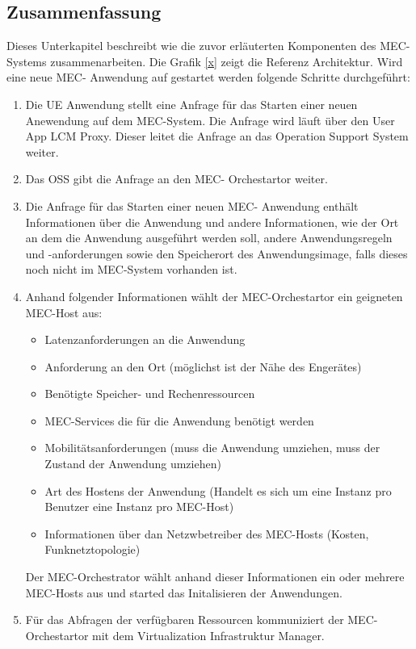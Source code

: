 \documentclass[runningheads]{llncs}
\numberwithin{figure}{section}
\begin{document}
\subsection{Zusammenfassung}
Dieses Unterkapitel beschreibt wie die zuvor erläuterten Komponenten des MEC-Systems zusammenarbeiten. Die Grafik \ref{x} zeigt die 
Referenz Architektur. Wird eine neue MEC- Anwendung auf gestartet werden folgende Schritte durchgeführt:
\begin{enumerate}
  \item Die UE Anwendung stellt eine Anfrage für das Starten einer neuen Anewendung auf dem MEC-System. Die Anfrage wird läuft über den 
  User App LCM Proxy. Dieser leitet die Anfrage an das Operation Support System weiter.
  \item Das OSS gibt die Anfrage an den MEC- Orchestartor weiter.
  \item Die Anfrage für das Starten einer neuen MEC- Anwendung enthält Informationen über 
  die Anwendung und andere Informationen, wie der Ort an dem die Anwendung ausgeführt werden soll, 
  andere Anwendungsregeln und -anforderungen sowie den Speicherort des Anwendungsimage, 
  falls dieses noch nicht im MEC-System vorhanden ist. 
  \item Anhand folgender Informationen wählt der MEC-Orchestartor ein geigneten MEC-Host aus:
  \begin{itemize}
    \item Latenzanforderungen an die Anwendung
    \item Anforderung an den Ort (möglichst ist der Nähe des Engerätes)
    \item Benötigte Speicher- und Rechenressourcen
    \item MEC-Services die für die Anwendung benötigt werden
    \item Mobilitätsanforderungen (muss die Anwendung umziehen, muss der Zustand der Anwendung umziehen)
    \item Art des Hostens der Anwendung (Handelt es sich um eine Instanz pro Benutzer eine Instanz pro MEC-Host)
    \item Informationen über dan Netzwbetreiber des MEC-Hosts (Kosten, Funknetztopologie)
  \end{itemize}
  Der MEC-Orchestrator wählt anhand dieser Informationen ein oder mehrere MEC-Hosts aus und started das Initalisieren der Anwendungen.
  \item Für das Abfragen der verfügbaren Ressourcen kommuniziert der MEC-Orchestartor mit dem Virtualization Infrastruktur Manager.

\end{enumerate}
\end{document}
